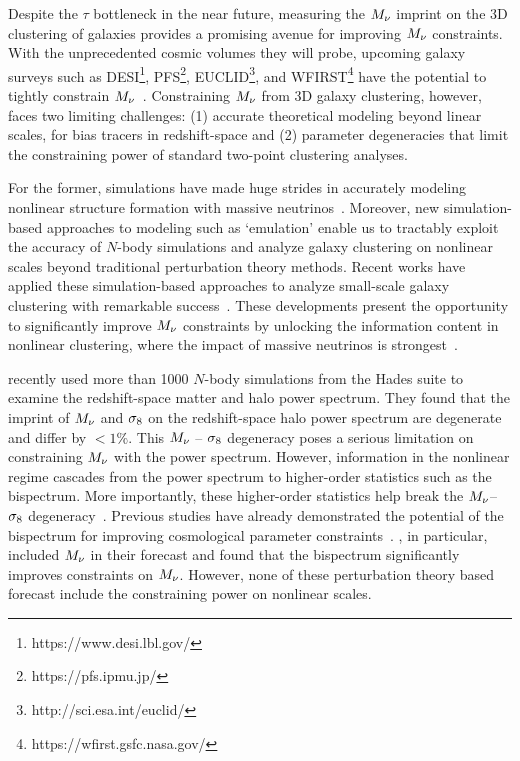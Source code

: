 Despite the $\tau$ bottleneck in the near future, measuring the $M_\nu$ imprint 
on the 3D clustering of galaxies provides a promising avenue for improving $M_\nu$ constraints. With the
unprecedented cosmic volumes they will probe, upcoming galaxy surveys 
such as DESI\footnote{https://www.desi.lbl.gov/}, PFS\footnote{https://pfs.ipmu.jp/}, 
EUCLID\footnote{http://sci.esa.int/euclid/}, and WFIRST\footnote{https://wfirst.gsfc.nasa.gov/} 
have the potential to tightly constrain $M_\nu$~\citep{audren2013, font-ribera2014, petracca2016, sartoris2016, boyle2018}.
Constraining $M_\nu$ from 3D galaxy clustering, however, faces two limiting
challenges: (1) accurate theoretical modeling beyond linear scales, for bias
tracers in redshift-space and (2) parameter degeneracies that limit the
constraining power of standard two-point clustering analyses. 

For the former, simulations have made huge strides in accurately modeling 
nonlinear structure formation with massive neutrinos~\citep[\eg][]{brandbyge2008, 
villaescusa-navarro2013, castorina2015, adamek2017, emberson2017, banerjee2018, 
villaescusa-navarro2018, villaescusa-navarro2019}. Moreover, new simulation-based
approaches to modeling such as `emulation' enable us to tractably exploit the accuracy of 
$N$-body simulations and analyze galaxy clustering on nonlinear scales beyond
traditional perturbation theory methods. Recent works have applied
these simulation-based approaches to analyze small-scale galaxy clustering with
remarkable success~\citep[\eg][]{heitmann2009, kwan2015, euclidcollaboration2018, lange2019, zhai2019, wibking2019}. 
These developments present the opportunity to significantly improve $M_\nu$
constraints by unlocking the information content in nonlinear clustering, where
the impact of massive neutrinos is strongest~\citep[\eg][]{brandbyge2008,
saito2008, wong2008, saito2009, viel2010, agarwal2011, marulli2011, bird2012,
castorina2015, banerjee2016, upadhye2016}.

\cite{villaescusa-navarro2018} recently used more than 1000 $N$-body
simulations from the {\sc Hades} suite to examine the redshift-space matter and
halo power spectrum.  They found that the imprint of $M_\nu$ and $\sigma_8$ on the
redshift-space halo power spectrum are degenerate and differ by $< 1\%$. This
$M_\nu$ -- $\sigma_8$ degeneracy poses a serious limitation on constraining $M_\nu$
with the power spectrum. However, information in the nonlinear regime cascades
from the power spectrum to higher-order statistics such as the bispectrum. More
importantly, these higher-order statistics help break the $M_\nu$--$\sigma_8$ 
degeneracy~\citep{hahn2020}. Previous studies have already demonstrated the
potential of the bispectrum for improving cosmological parameter
constraints~\citep{sefusatti2005, sefusatti2006, chan2017, yankelevich2019}.
\cite{chudaykin2019}, in particular, included $M_\nu$ in their forecast and
found that the bispectrum significantly improves constraints on $M_\nu$.
However, none of these perturbation theory based forecast include the
constraining power on nonlinear scales. 

